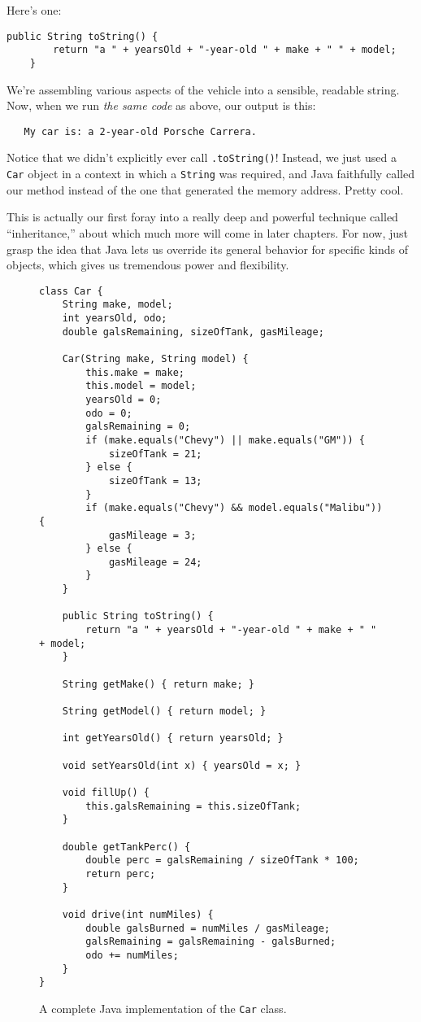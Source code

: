 Here's one:

\begin{Verbatim}[samepage=true,fontsize=\scriptsize,frame=single]
    public String toString() {
        return "a " + yearsOld + "-year-old " + make + " " + model;
    }
\end{Verbatim}

We're assembling various aspects of the vehicle into a sensible, readable
string. Now, when we run \textit{the same code} as above, our output is this:

\begin{verbatim}
   My car is: a 2-year-old Porsche Carrera.
\end{verbatim}

Notice that we didn't explicitly ever call \texttt{.toString()}! Instead, we
just used a \texttt{Car} object in a context in which a \texttt{String} was
required, and Java faithfully called our method instead of the one that
generated the memory address. Pretty cool.

This is actually our first foray into a really deep and powerful technique
called ``inheritance,'' about which much more will come in later chapters. For
now, just grasp the idea that Java lets us override its general behavior for
specific kinds of objects, which gives us tremendous power and flexibility.

\begin{figure}
\begin{Verbatim}[fontsize=\scriptsize,frame=single]
class Car {
    String make, model;
    int yearsOld, odo;
    double galsRemaining, sizeOfTank, gasMileage;

    Car(String make, String model) {
        this.make = make;
        this.model = model;
        yearsOld = 0;
        odo = 0;
        galsRemaining = 0;
        if (make.equals("Chevy") || make.equals("GM")) {
            sizeOfTank = 21;
        } else {
            sizeOfTank = 13;
        }
        if (make.equals("Chevy") && model.equals("Malibu")) {
            gasMileage = 3;
        } else {
            gasMileage = 24;
        }
    }

    public String toString() {
        return "a " + yearsOld + "-year-old " + make + " " + model;
    }

    String getMake() { return make; }

    String getModel() { return model; }

    int getYearsOld() { return yearsOld; }

    void setYearsOld(int x) { yearsOld = x; }

    void fillUp() {
        this.galsRemaining = this.sizeOfTank;
    }

    double getTankPerc() {
        double perc = galsRemaining / sizeOfTank * 100;
        return perc;
    }

    void drive(int numMiles) {
        double galsBurned = numMiles / gasMileage;
        galsRemaining = galsRemaining - galsBurned;
        odo += numMiles;
    }
}
\end{Verbatim}
\caption{A complete Java implementation of the \texttt{Car} class.}
\label{fig:carClassCodePreExceptions}
\end{figure}
